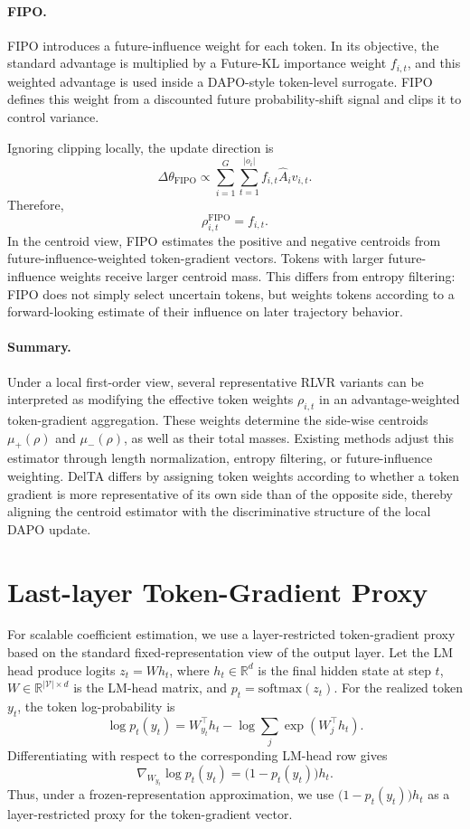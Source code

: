 \documentclass{article} %
\begin{document}
\paragraph{FIPO.}
FIPO introduces a future-influence weight for each token. In its objective, the
standard advantage is multiplied by a Future-KL importance weight \(f_{i,t}\),
and this weighted advantage is used inside a DAPO-style token-level surrogate.
FIPO defines this weight from a discounted future probability-shift signal and
clips it to control variance.

Ignoring clipping locally, the update direction is
\begin{equation}
\label{eq:fipo-local-centroid}
\Delta\theta_{\mathrm{FIPO}}
\propto
\sum_{i=1}^{G}
\sum_{t=1}^{|o_i|}
f_{i,t}\hat A_i v_{i,t}.
\end{equation}
Therefore,
\[
\rho_{i,t}^{\mathrm{FIPO}}=f_{i,t}.
\]
In the centroid view, FIPO estimates the positive and negative centroids from
future-influence-weighted token-gradient vectors. Tokens with larger
future-influence weights receive larger centroid mass. This differs from entropy
filtering: FIPO does not simply select uncertain tokens, but weights tokens
according to a forward-looking estimate of their influence on later trajectory
behavior.

\paragraph{Summary.}
Under a local first-order view, several representative RLVR variants can be
interpreted as modifying the effective token weights \(\rho_{i,t}\) in an
advantage-weighted token-gradient aggregation. These weights determine the
side-wise centroids \(\mu_+(\rho)\) and \(\mu_-(\rho)\), as well as their total
masses. Existing methods adjust this estimator through length normalization,
entropy filtering, or future-influence weighting. DelTA differs by assigning
token weights according to whether a token gradient is more representative of
its own side than of the opposite side, thereby aligning the centroid estimator
with the discriminative structure of the local DAPO update.

\section{Last-layer Token-Gradient Proxy}
\label{app:proxy}

For scalable coefficient estimation, we use a layer-restricted token-gradient proxy based on the standard fixed-representation view of the output layer. Let the LM head produce logits \(z_t = W h_t\), where \(h_t \in \mathbb{R}^d\)
is the final hidden state at step \(t\), \(W \in \mathbb{R}^{|\mathcal V|\times d}\)
is the LM-head matrix, and \(p_t=\mathrm{softmax}(z_t)\). For the realized token
\(y_t\), the token log-probability is
\[
\log p_t(y_t)
=
W_{y_t}^{\top}h_t
-
\log\sum_j \exp(W_j^{\top}h_t).
\]
Differentiating with respect to the corresponding LM-head row gives
\[
\nabla_{W_{y_t}}\log p_t(y_t)
=
\bigl(1-p_t(y_t)\bigr)h_t.
\]
Thus, under a frozen-representation approximation, we use
\(\bigl(1-p_t(y_t)\bigr)h_t\) as a layer-restricted proxy for the token-gradient
vector.
\end{document}
